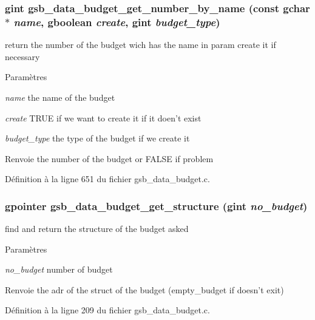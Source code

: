 \subsubsection[{gsb\_\-data\_\-budget\_\-get\_\-number\_\-by\_\-name}]{\setlength{\rightskip}{0pt plus 5cm}gint gsb\_\-data\_\-budget\_\-get\_\-number\_\-by\_\-name (const gchar $\ast$ {\em name}, \/  gboolean {\em create}, \/  gint {\em budget\_\-type})}\label{gsb__data__budget_8c_a1c78de4fbfc0360b85bd503eafe28c96}
return the number of the budget wich has the name in param create it if necessary


\begin{DoxyParams}{Paramètres}
\item[{\em name}]the name of the budget \item[{\em create}]TRUE if we want to create it if it doen't exist \item[{\em budget\_\-type}]the type of the budget if we create it\end{DoxyParams}
\begin{DoxyReturn}{Renvoie}
the number of the budget or FALSE if problem 
\end{DoxyReturn}


Définition à la ligne 651 du fichier gsb\_\-data\_\-budget.c.

\subsubsection[{gsb\_\-data\_\-budget\_\-get\_\-structure}]{\setlength{\rightskip}{0pt plus 5cm}gpointer gsb\_\-data\_\-budget\_\-get\_\-structure (gint {\em no\_\-budget})}\label{gsb__data__budget_8c_ace802eb38829d136f54f4f7b981a29c6}
find and return the structure of the budget asked


\begin{DoxyParams}{Paramètres}
\item[{\em no\_\-budget}]number of budget\end{DoxyParams}
\begin{DoxyReturn}{Renvoie}
the adr of the struct of the budget (empty\_\-budget if doesn't exit) 
\end{DoxyReturn}


Définition à la ligne 209 du fichier gsb\_\-data\_\-budget.c.

